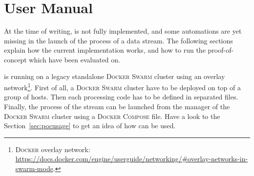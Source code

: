 
\chapter{User Manual}
\label{chap:usermanual}

At the time of writing, \SS{} is not fully implemented, and some automations are yet missing in the launch of the process of a data stream.
The following sections explain how the current implementation works, and how to run the proof-of-concept which \SS{} have been evaluated on.

\SS{} is running on a legacy standalone \textsc{Docker Swarm} cluster using an overlay network\footnote{\textsc{Docker} overlay network: \url{https://docs.docker.com/engine/userguide/networking/\#overlay-networks-in-swarm-mode}.}.
First of all, a \textsc{Docker Swarm} cluster have to be deployed on top of a group of hosts.
Then each processing code has to be defined in separated files.
Finally, the process of the stream can be launched from the manager of the \textsc{Docker Swarm} cluster using a \textsc{Docker Compose} file.
Have a look to the Section~\ref{sec:pocusage} to get an idea of how \SS{} can be used.




\newpage



\newpage



\newpage


